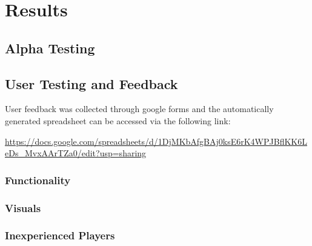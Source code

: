 \chapter{Results}
\label{chapter3}


\section{Alpha Testing}







\section{User Testing and Feedback}

User feedback was collected through google forms and the automatically generated spreadsheet can be accessed via the following link:
\begin{center}
    \url{https://docs.google.com/spreadsheets/d/1DjMKbAfgBAj0ksE6rK4WPJBflKK6LeDs_MvxAArTZa0/edit?usp=sharing}
\end{center}

\subsection{Functionality}

\subsection{Visuals}

\subsection{Inexperienced Players}